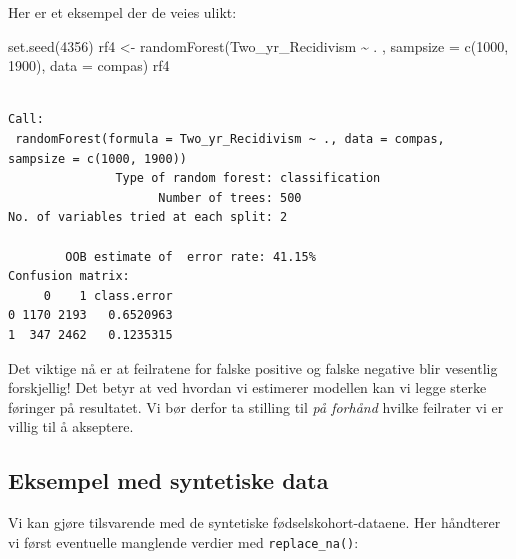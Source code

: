 \documentclass[
  letterpaper,
  DIV=11,
  numbers=noendperiod]{scrreprt}
\newenvironment{Shaded}{\begin{snugshade}}{\end{snugshade}}
\newcommand{\AttributeTok}[1]{\textcolor[rgb]{0.40,0.45,0.13}{#1}}
\newcommand{\DecValTok}[1]{\textcolor[rgb]{0.68,0.00,0.00}{#1}}
\newcommand{\FunctionTok}[1]{\textcolor[rgb]{0.28,0.35,0.67}{#1}}
\newcommand{\NormalTok}[1]{\textcolor[rgb]{0.00,0.23,0.31}{#1}}
\newcommand{\OtherTok}[1]{\textcolor[rgb]{0.00,0.23,0.31}{#1}}
\newcommand{\SpecialCharTok}[1]{\textcolor[rgb]{0.37,0.37,0.37}{#1}}
\begin{document}
Her er et eksempel der de veies ulikt:

\begin{Shaded}
\begin{Highlighting}[]
\FunctionTok{set.seed}\NormalTok{(}\DecValTok{4356}\NormalTok{)}
\NormalTok{rf4 }\OtherTok{\textless{}{-}} \FunctionTok{randomForest}\NormalTok{(Two\_yr\_Recidivism }\SpecialCharTok{\textasciitilde{}}\NormalTok{ . ,}
                    \AttributeTok{sampsize =} \FunctionTok{c}\NormalTok{(}\DecValTok{1000}\NormalTok{, }\DecValTok{1900}\NormalTok{),}
                   \AttributeTok{data =}\NormalTok{ compas)}
\NormalTok{rf4}
\end{Highlighting}
\end{Shaded}

\begin{verbatim}

Call:
 randomForest(formula = Two_yr_Recidivism ~ ., data = compas,      sampsize = c(1000, 1900)) 
               Type of random forest: classification
                     Number of trees: 500
No. of variables tried at each split: 2

        OOB estimate of  error rate: 41.15%
Confusion matrix:
     0    1 class.error
0 1170 2193   0.6520963
1  347 2462   0.1235315
\end{verbatim}

Det viktige nå er at feilratene for falske positive og falske negative
blir vesentlig forskjellig! Det betyr at ved hvordan vi estimerer
modellen kan vi legge sterke føringer på resultatet. Vi bør derfor ta
stilling til \emph{på forhånd} hvilke feilrater vi er villig til å
akseptere.

\subsection{Eksempel med syntetiske
data}\label{eksempel-med-syntetiske-data}

Vi kan gjøre tilsvarende med de syntetiske fødselskohort-dataene. Her
håndterer vi først eventuelle manglende verdier med
\texttt{replace\_na()}:
\end{document}

